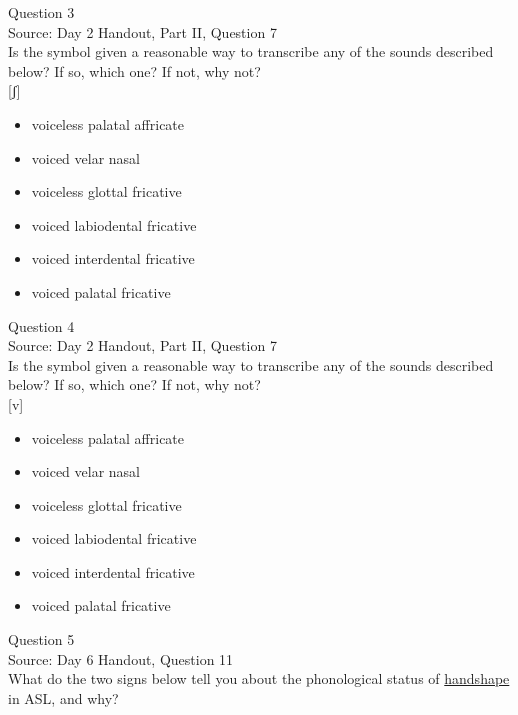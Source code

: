 \documentclass[12pt]{article}
\begin{document}
\newpage

{\large Question 3}\\

Source: Day 2 Handout, Part II, Question 7\\

Is the symbol given a reasonable way to transcribe any of the sounds described below? If so, which one? If not, why not?\\

{[ʃ]}

\begin{itemize} \item voiceless palatal affricate \item voiced velar nasal \item voiceless glottal fricative \item voiced labiodental fricative \item voiced interdental fricative \item voiced palatal fricative \end{itemize}


\newpage

{\large Question 4}\\

Source: Day 2 Handout, Part II, Question 7\\

Is the symbol given a reasonable way to transcribe any of the sounds described below? If so, which one? If not, why not?\\

{[v]}

\begin{itemize} \item voiceless palatal affricate \item voiced velar nasal \item voiceless glottal fricative \item voiced labiodental fricative \item voiced interdental fricative \item voiced palatal fricative \end{itemize}


\newpage

{\large Question 5}\\

Source: Day 6 Handout, Question 11\\

What do the two signs below tell you about the phonological status of \underline{handshape} in ASL, and why?\\
\end{document}
